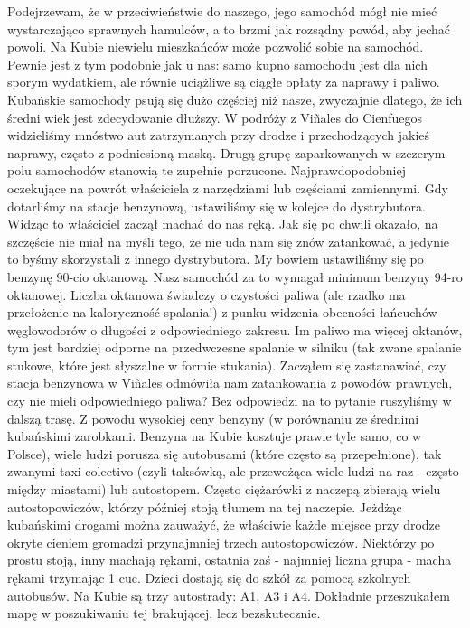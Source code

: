 Podejrzewam, że w przeciwieństwie do naszego, jego samochód mógł nie mieć wystarczająco sprawnych hamulców, a to brzmi jak rozsądny powód, aby jechać powoli.
Na Kubie niewielu mieszkańców może pozwolić sobie na samochód.
Pewnie jest z tym podobnie jak u nas: samo kupno samochodu jest dla nich sporym wydatkiem, ale równie uciążliwe są ciągłe opłaty za naprawy i paliwo.
Kubańskie samochody psują się dużo częściej niż nasze, zwyczajnie dlatego, że ich średni wiek jest zdecydowanie dłuższy.
W podróży z Viñales do Cienfuegos widzieliśmy mnóstwo aut zatrzymanych przy drodze i przechodzących jakieś naprawy, często z podniesioną maską.
Drugą grupę zaparkowanych w szczerym polu samochodów stanowią te zupełnie porzucone.
Najprawdopodobniej oczekujące na powrót właściciela z narzędziami lub częściami zamiennymi.
Gdy dotarliśmy na stacje benzynową, ustawiliśmy się w kolejce do dystrybutora.
Widząc to właściciel zaczął machać do nas ręką.
Jak się po chwili okazało, na szczęście nie miał na myśli tego, że nie uda nam się znów zatankować, a jedynie to byśmy skorzystali z innego dystrybutora.
My bowiem ustawiliśmy się po benzynę 90-cio oktanową.
Nasz samochód za to wymagał minimum benzyny 94-ro oktanowej.
Liczba oktanowa świadczy o czystości paliwa (ale rzadko ma przełożenie na kaloryczność spalania!) z punku widzenia obecności łańcuchów węglowodorów o długości z odpowiedniego zakresu.
Im paliwo ma więcej oktanów, tym jest bardziej odporne na przedwczesne spalanie w silniku (tak zwane spalanie stukowe, które jest słyszalne w formie stukania).
Zacząłem się zastanawiać, czy stacja benzynowa w Viñales odmówiła nam zatankowania z powodów prawnych, czy nie mieli odpowiedniego paliwa?
Bez odpowiedzi na to pytanie ruszyliśmy w dalszą trasę.
Z powodu wysokiej ceny benzyny (w porównaniu ze średnimi kubańskimi zarobkami.
Benzyna na Kubie kosztuje prawie tyle samo, co w Polsce), wiele ludzi porusza się autobusami (które często są przepełnione), tak zwanymi taxi colectivo (czyli taksówką, ale przewożąca wiele ludzi na raz - często między miastami) lub autostopem.
Często ciężarówki z naczepą zbierają wielu autostopowiczów, którzy później stoją tłumem na tej naczepie.
Jeżdżąc kubańskimi drogami można zauważyć, że właściwie każde miejsce przy drodze okryte cieniem gromadzi przynajmniej trzech autostopowiczów.
Niektórzy po prostu stoją, inny machają rękami, ostatnia zaś - najmniej liczna grupa - macha rękami trzymając 1 cuc.
Dzieci dostają się do szkół za pomocą szkolnych autobusów.
Na Kubie są trzy autostrady: A1, A3 i A4.
Dokładnie przeszukałem mapę w poszukiwaniu tej brakującej, lecz bezskutecznie.
